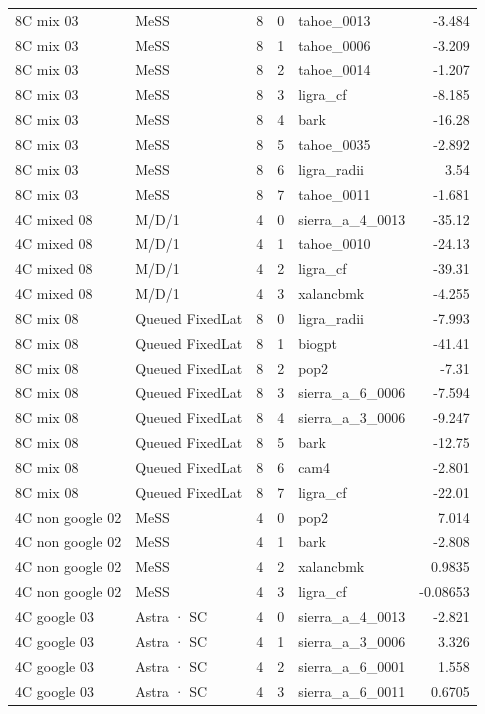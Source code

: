\begin{tabular}{llrrlr}
8C mix 03 & MeSS & 8 & 0 & tahoe\_0013 & -3.484 \\
8C mix 03 & MeSS & 8 & 1 & tahoe\_0006 & -3.209 \\
8C mix 03 & MeSS & 8 & 2 & tahoe\_0014 & -1.207 \\
8C mix 03 & MeSS & 8 & 3 & ligra\_cf & -8.185 \\
8C mix 03 & MeSS & 8 & 4 & bark & -16.28 \\
8C mix 03 & MeSS & 8 & 5 & tahoe\_0035 & -2.892 \\
8C mix 03 & MeSS & 8 & 6 & ligra\_radii & 3.54 \\
8C mix 03 & MeSS & 8 & 7 & tahoe\_0011 & -1.681 \\
4C mixed 08 & M/D/1 & 4 & 0 & sierra\_a\_4\_0013 & -35.12 \\
4C mixed 08 & M/D/1 & 4 & 1 & tahoe\_0010 & -24.13 \\
4C mixed 08 & M/D/1 & 4 & 2 & ligra\_cf & -39.31 \\
4C mixed 08 & M/D/1 & 4 & 3 & xalancbmk & -4.255 \\
8C mix 08 & Queued FixedLat & 8 & 0 & ligra\_radii & -7.993 \\
8C mix 08 & Queued FixedLat & 8 & 1 & biogpt & -41.41 \\
8C mix 08 & Queued FixedLat & 8 & 2 & pop2 & -7.31 \\
8C mix 08 & Queued FixedLat & 8 & 3 & sierra\_a\_6\_0006 & -7.594 \\
8C mix 08 & Queued FixedLat & 8 & 4 & sierra\_a\_3\_0006 & -9.247 \\
8C mix 08 & Queued FixedLat & 8 & 5 & bark & -12.75 \\
8C mix 08 & Queued FixedLat & 8 & 6 & cam4 & -2.801 \\
8C mix 08 & Queued FixedLat & 8 & 7 & ligra\_cf & -22.01 \\
4C non google 02 & MeSS & 4 & 0 & pop2 & 7.014 \\
4C non google 02 & MeSS & 4 & 1 & bark & -2.808 \\
4C non google 02 & MeSS & 4 & 2 & xalancbmk & 0.9835 \\
4C non google 02 & MeSS & 4 & 3 & ligra\_cf & -0.08653 \\
4C google 03 & Astra · SC & 4 & 0 & sierra\_a\_4\_0013 & -2.821 \\
4C google 03 & Astra · SC & 4 & 1 & sierra\_a\_3\_0006 & 3.326 \\
4C google 03 & Astra · SC & 4 & 2 & sierra\_a\_6\_0001 & 1.558 \\
4C google 03 & Astra · SC & 4 & 3 & sierra\_a\_6\_0011 & 0.6705 \\

\end{tabular}
